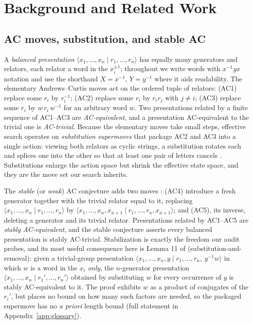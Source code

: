 \section{Background and Related Work}\label{sec:background}

\subsection{AC moves, substitution, and stable AC}

A \emph{balanced presentation} $\langle x_1,\dots,x_n \mid r_1,\dots,r_n\rangle$ has
equally many generators and relators, each relator a word in the $x_i^{\pm 1}$; throughout
we write words with $x^{-1}yx$ notation and use the shorthand $X=x^{-1}$, $Y=y^{-1}$ where
it aids readability. The elementary Andrews--Curtis moves act on the ordered tuple of
relators: (AC1) replace some $r_i$ by $r_i^{-1}$; (AC2) replace some $r_i$ by $r_i r_j$
with $j\neq i$; (AC3) replace some $r_i$ by $w\, r_i\, w^{-1}$ for an arbitrary word $w$.
Two presentations related by a finite sequence of AC1--AC3 are \emph{AC-equivalent}, and a
presentation AC-equivalent to the trivial one is \emph{AC-trivial}. Because the elementary
moves take small steps, effective search operates on \emph{substitution supermoves} that
package AC2 and AC3 into a single action: viewing both relators as cyclic strings, a
substitution rotates each and splices one into the other so that at least one pair of
letters cancels \cite{fagan2026twohump}. Substitutions enlarge the action space but shrink
the effective state space, and they are the move set our search inherits.

The \emph{stable} (or \emph{weak}) AC conjecture adds two moves \cite{shehper2024hard}:
(AC4) introduce a fresh generator together with the trivial relator equal to it, replacing
$\langle x_1,\dots,x_n \mid r_1,\dots,r_n\rangle$ by $\langle x_1,\dots,x_n,x_{n+1} \mid
r_1,\dots,r_n,x_{n+1}\rangle$; and (AC5), its inverse, deleting a generator and its trivial
relator. Presentations related by AC1--AC5 are \emph{stably AC-equivalent}, and the stable
conjecture asserts every balanced presentation is stably AC-trivial. Stabilization is
exactly the freedom our audit probes, and its most useful consequence here is Lemma 11 of
\cite{shehper2024hard} (substitution-and-removal): given a trivial-group presentation
$\langle x_1,\dots,x_n,y \mid r_1,\dots,r_n,\ y^{-1}w\rangle$ in which $w$ is a word in the
$x_i$ \emph{only}, the $n$-generator presentation $\langle x_1,\dots,x_n \mid
r_1',\dots,r_n'\rangle$ obtained by substituting $w$ for every occurrence of $y$ is stably
AC-equivalent to it. The proof exhibits $w$ as a product of conjugates of the $r_i'$, but
places no bound on how many such factors are needed, so the packaged supermove has no
\emph{a priori} length bound (full statement in Appendix~\ref{app:glossary}).


